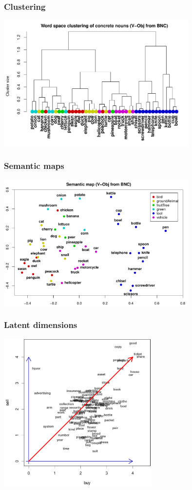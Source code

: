 \begin{frame}[c]
  \frametitle{Clustering}

  \begin{center}
    \includegraphics[width=100mm]{img/hieroglyph_clustering}
  \end{center}
\end{frame}

\begin{frame}[c]
  \frametitle{Semantic maps}

  \begin{center}
    \includegraphics[width=100mm]{img/hieroglyph_semantic_map}
  \end{center}
\end{frame}

\begin{frame}[c]
  \frametitle{Latent dimensions}

  \begin{center}
    \includegraphics[width=8cm]{img/3_buy_sell_labels_latent}
  \end{center}
\end{frame}

